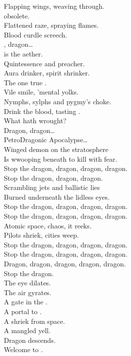 Flapping wings, weaving through. \\
 obsolete. \\
Flattened raze, spraying flames. \\
Blood curdle screech. \\

, dragon… \\

 is the aether. \\
Quintessence and preacher. \\
Aura drinker, spirit shrinker. \\
The one true . \\
Vile smile, 'mental yolks. \\
Nymphs, sylphs and pygmy's choke. \\
Drink the blood, tasting . \\
What hath  wrought? \\

Dragon, dragon… \\

PetroDragonic Apocalypse… \\

Winged demon on the stratosphere \\
Is wwooping beneath to kill with fear. \\
Stop the dragon, dragon, dragon, dragon. \\
Stop the dragon, dragon, dragon. \\

Scrambling jets and ballistic lies \\
Burned underneath the lidless eyes. \\
Stop the dragon, dragon, dragon, dragon. \\
Stop the dragon, dragon, dragon, dragon. \\

Atomic space, chaos, it reeks. \\
Pilots shriek, cities weep. \\
Stop the dragon, dragon, dragon, dragon. \\
Stop the dragon, dragon, dragon, dragon. \\
Dragon, dragon, dragon, dragon, dragon. \\
Stop the dragon. \\

The eye dilates. \\
The air gyrates. \\
A gate in the . \\
A portal to . \\
A shriek from space. \\
A mangled yell. \\
Dragon descends. \\
Welcome to . \\

